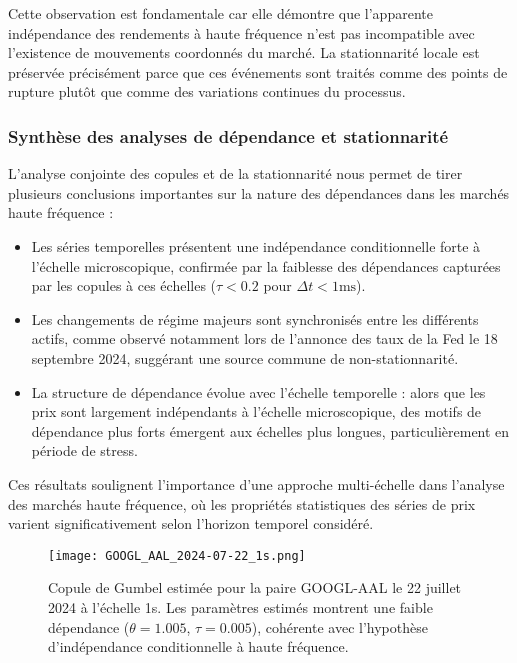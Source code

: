 \documentclass[12pt,a4paper]{article}
\theoremstyle{definition}
\theoremstyle{remark}
\begin{document}
Cette observation est fondamentale car elle démontre que l'apparente indépendance des rendements à haute fréquence n'est pas incompatible avec l'existence de mouvements coordonnés du marché. La stationnarité locale est préservée précisément parce que ces événements sont traités comme des points de rupture plutôt que comme des variations continues du processus.

\subsubsection{Synthèse des analyses de dépendance et stationnarité}

L'analyse conjointe des copules et de la stationnarité nous permet de tirer plusieurs conclusions importantes sur la nature des dépendances dans les marchés haute fréquence :

\begin{itemize}
    \item Les séries temporelles présentent une indépendance conditionnelle forte à l'échelle microscopique, confirmée par la faiblesse des dépendances capturées par les copules à ces échelles ($\tau < 0.2$ pour $\Delta t < 1\text{ms}$).
    
    \item Les changements de régime majeurs sont synchronisés entre les différents actifs, comme observé notamment lors de l'annonce des taux de la Fed le 18 septembre 2024, suggérant une source commune de non-stationnarité.
    
    \item La structure de dépendance évolue avec l'échelle temporelle : alors que les prix sont largement indépendants à l'échelle microscopique, des motifs de dépendance plus forts émergent aux échelles plus longues, particulièrement en période de stress.
\end{itemize}

Ces résultats soulignent l'importance d'une approche multi-échelle dans l'analyse des marchés haute fréquence, où les propriétés statistiques des séries de prix varient significativement selon l'horizon temporel considéré.

\begin{figure}[h!]
    \centering
    \texttt{[image: GOOGL\_AAL\_2024-07-22\_1s.png]}
    \caption{Copule de Gumbel estimée pour la paire GOOGL-AAL le 22 juillet 2024 à l'échelle 1s. Les paramètres estimés montrent une faible dépendance ($\theta = 1.005$, $\tau = 0.005$), cohérente avec l'hypothèse d'indépendance conditionnelle à haute fréquence.}
    \label{fig:copula_example}
\end{figure}
\end{document}
